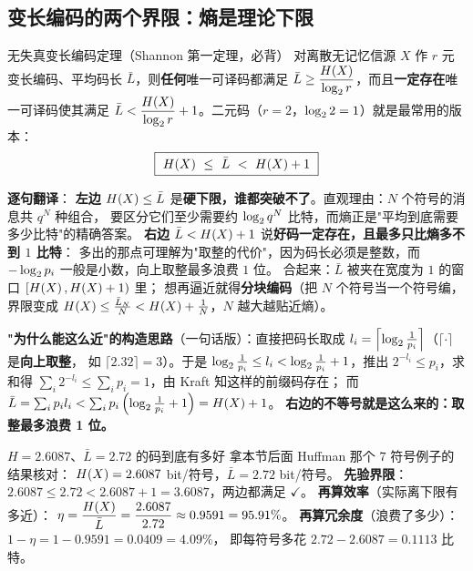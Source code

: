 \subsection{变长编码的两个界限：熵是理论下限}

\begin{defbox}{无失真变长编码定理（Shannon 第一定理，必背）}
对离散无记忆信源 $X$ 作 $r$ 元变长编码、平均码长 $\bar L$，则\textbf{任何}唯一可译码都满足
$\bar L\ge\dfrac{H\!\left(X\right)}{\log_{2} r}$，而且\textbf{一定存在}唯一可译码使其满足
$\bar L<\dfrac{H\!\left(X\right)}{\log_{2} r}+1$。二元码（$r=2$，$\log_{2}2=1$）就是最常用的版本：
\begin{align*}
\boxed{\ H\!\left(X\right)\ \le\ \bar L\ <\ H\!\left(X\right)+1\ }
\end{align*}
\end{defbox}

\textbf{逐句翻译}：
\textbf{左边 $H\!\left(X\right)\le\bar L$} 是\textbf{硬下限，谁都突破不了}。直观理由：$N$ 个符号的消息共 $q^N$ 种组合，
要区分它们至少需要约 $\log_{2} q^N$ 比特，而熵正是"平均到底需要多少比特"的精确答案。
\textbf{右边 $\bar L<H\!\left(X\right)+1$} 说\textbf{好码一定存在，且最多只比熵多不到 $1$ 比特}：
多出的那点可理解为"取整的代价"，因为码长必须是整数，而 $-\log_{2} p_i$ 一般是小数，向上取整最多浪费 $1$ 位。
合起来：$\bar L$ 被夹在宽度为 $1$ 的窗口 $[H\!\left(X\right),H\!\left(X\right)+1)$ 里；
想再逼近就得\textbf{分块编码}（把 $N$ 个符号当一个符号编，界限变成
$H\!\left(X\right)\le\frac{\bar L_N}{N}<H\!\left(X\right)+\frac1N$，$N$ 越大越贴近熵）。

\textbf{"为什么能这么近"的构造思路}（一句话版）：直接把码长取成
$l_i=\left\lceil\log_{2}\frac{1}{p_i}\right\rceil$（$\lceil\cdot\rceil$ 是\textbf{向上取整}，
如 $\lceil2.32\rceil=3$）。于是 $\log_{2}\frac1{p_i}\le l_i<\log_{2}\frac1{p_i}+1$，推出
$2^{-l_i}\le p_i$，求和得 $\sum_i2^{-l_i}\le\sum_ip_i=1$，由 Kraft 知这样的前缀码存在；
而 $\bar L=\sum_ip_il_i<\sum_ip_i\left(\log_{2}\frac1{p_i}+1\right)=H\!\left(X\right)+1$。
\textbf{右边的不等号就是这么来的：取整最多浪费 1 位。}

\begin{calc}{$H=2.6087$、$\bar L=2.72$ 的码到底有多好}
拿本节后面 Huffman 那个 $7$ 符号例子的结果核对：
$H\!\left(X\right)=2.6087$ bit/符号，$\bar L=2.72$ bit/符号。
\textbf{先验界限}：$2.6087\le2.72<2.6087+1=3.6087$，两边都满足 $\checkmark$。
\textbf{再算效率}（实际离下限有多近）：
$\eta=\dfrac{H\!\left(X\right)}{\bar L}=\dfrac{2.6087}{2.72}\approx0.9591=95.91\%$。
\textbf{再算冗余度}（浪费了多少）：$1-\eta=1-0.9591=0.0409=4.09\%$，
即每符号多花 $2.72-2.6087=0.1113$ 比特。
\end{calc}

